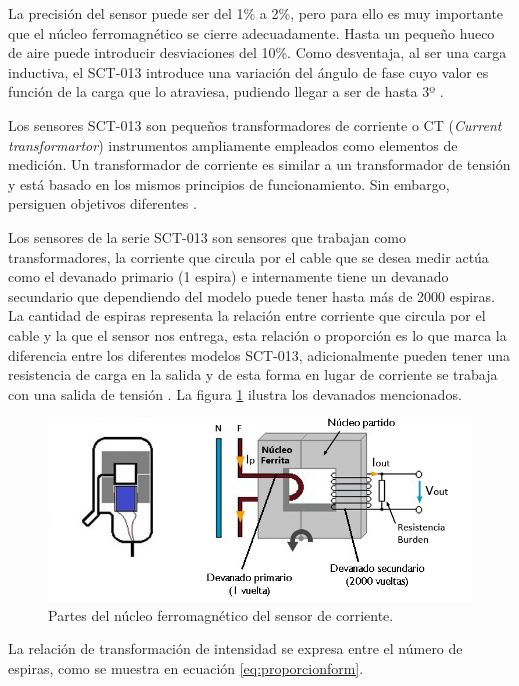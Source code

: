 \begin{enumerate}
La precisión del sensor puede ser del 1\% a 2\%, pero para ello es muy importante que el núcleo ferromagnético se cierre adecuadamente. Hasta un pequeño hueco de aire puede introducir desviaciones del 10\%. Como desventaja, al ser una carga inductiva, el SCT-013 introduce una variación del ángulo de fase cuyo valor es función de la carga que lo atraviesa, pudiendo llegar a ser de hasta 3º \citep{WEBSITE:9}.

Los sensores SCT-013 son pequeños transformadores de corriente o CT (\emph{Current transformartor}) instrumentos ampliamente empleados como elementos de medición. Un transformador de corriente es similar a un transformador de tensión y está basado en los mismos principios de funcionamiento. Sin embargo, persiguen objetivos diferentes \citep{WEBSITE:9}.

Los sensores de la serie SCT-013 son sensores que trabajan como transformadores, la corriente que circula por el cable que se desea medir actúa como el devanado primario (1 espira) e internamente tiene un devanado secundario que dependiendo del modelo puede tener hasta más de 2000 espiras. La cantidad de espiras representa la relación entre corriente que circula por el cable y la que el sensor nos entrega, esta relación o proporción es lo que marca la diferencia entre los diferentes modelos SCT-013, adicionalmente pueden tener una resistencia de carga en la salida y de esta forma en lugar de corriente se trabaja con una salida de tensión \citep{WEBSITE:21}. La figura \ref{fig:espiras} ilustra los devanados mencionados.


\begin{figure}[htpb]
\centering 
\includegraphics[width=1.0\textwidth]{./Figures/espiras.jpg}
\caption{Partes del núcleo ferromagnético del sensor de corriente.}
\label{fig:espiras}
\end{figure}

La relación de transformación de intensidad se expresa entre el número de espiras, como se muestra en ecuación \ref{eq:proporcionform}.


\end{enumerate}

